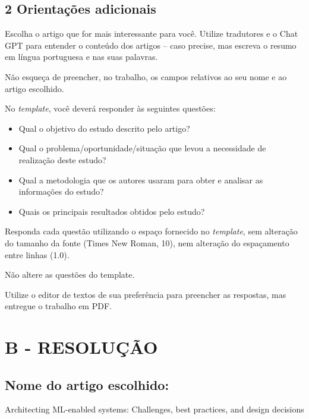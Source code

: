 \subsection*{\textbf{2 Orientações adicionais}}



Escolha o artigo que for mais interessante para você. Utilize tradutores e o Chat GPT para entender o conteúdo dos
artigos – caso precise, mas escreva o resumo em língua portuguesa e nas suas palavras. 



Não esqueça de preencher, no trabalho, os campos relativos ao seu nome e ao artigo escolhido.



No \textit{template}, você deverá responder às seguintes questões:

\begin{itemize}
\item Qual o objetivo do estudo descrito pelo artigo?
\item Qual o problema/oportunidade/situação que levou a necessidade de realização deste estudo?
\item Qual a metodologia que os autores usaram para obter e analisar as informações do estudo?
\item Quais os principais resultados obtidos pelo estudo?
\end{itemize}


Responda cada questão utilizando o espaço fornecido no \textit{template}, sem alteração do tamanho da fonte (Times New
Roman, 10), nem alteração do espaçamento entre linhas (1.0).



Não altere as questões do template.



Utilize o editor de textos de sua preferência para preencher as respostas, mas entregue o trabalho em PDF.


\section*{\textbf{B - RESOLUÇÃO}}
\subsection*{\textbf{Nome do artigo escolhido:}}
\noindent Architecting ML-enabled systems: Challenges, best practices, and design decisions

